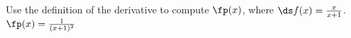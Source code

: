 {Use the definition of the derivative to compute $\fp(x)$, where $\ds f(x) = \frac{x}{x+1}$.
}
{$\fp(x) = \frac{1}{(x+1)^2}$
}
